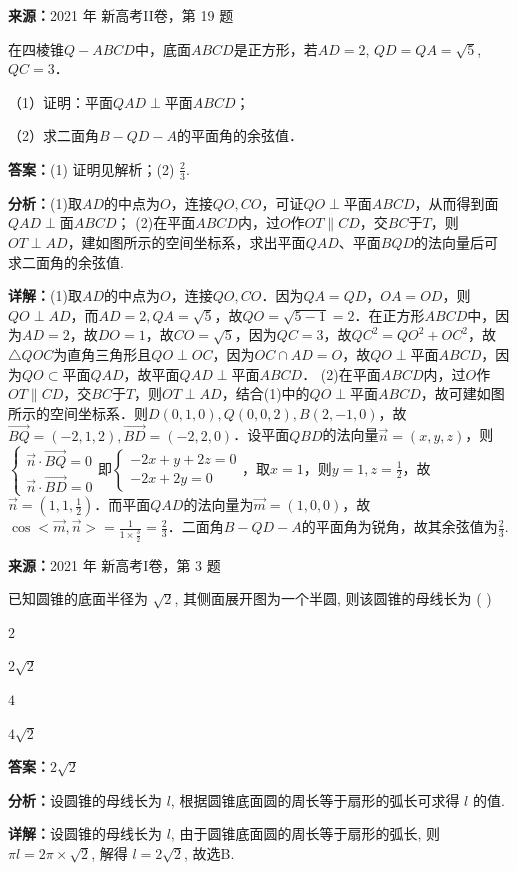 \begin{question}[points=12]
\textbf{来源：}2021 年 新高考II卷，第 19 题\par
在四棱锥$Q-ABCD$中，底面$ABCD$是正方形，若$AD=2$, $QD=QA=\sqrt{5}$, $QC=3$．

（1）证明：平面$QAD\perp$平面$ABCD$；

（2）求二面角$B-QD-A$的平面角的余弦值．
\begin{solution}
\textbf{答案：}(1) 证明见解析；(2) $\frac{2}{3}$.

\textbf{分析：}(1)取$AD$的中点为$O$，连接$QO,CO$，可证$QO\perp$平面$ABCD$，从而得到面$QAD\perp$面$ABCD$； (2)在平面$ABCD$内，过$O$作$OT\parallel CD$，交$BC$于$T$，则$OT\perp AD$，建如图所示的空间坐标系，求出平面$QAD$、平面$BQD$的法向量后可求二面角的余弦值.

\textbf{详解：}(1)取$AD$的中点为$O$，连接$QO,CO$．因为$QA=QD$，$OA=OD$，则$QO\perp AD$，而$AD=2,QA=\sqrt{5}$，故$QO=\sqrt{5-1}=2$．在正方形$ABCD$中，因为$AD=2$，故$DO=1$，故$CO=\sqrt{5}$，因为$QC=3$，故$QC^2=QO^2+OC^2$，故$\triangle QOC$为直角三角形且$QO\perp OC$，因为$OC\cap AD=O$，故$QO\perp$平面$ABCD$，因为$QO\subset$平面$QAD$，故平面$QAD\perp$平面$ABCD$． (2)在平面$ABCD$内，过$O$作$OT\parallel CD$，交$BC$于$T$，则$OT\perp AD$，结合(1)中的$QO\perp$平面$ABCD$，故可建如图所示的空间坐标系．则$D(0,1,0),Q(0,0,2),B(2,-1,0)$，故$\overrightarrow{BQ}=(-2,1,2),\overrightarrow{BD}=(-2,2,0)$．设平面$QBD$的法向量$\vec{n}=(x,y,z)$，则$\begin{cases} \vec{n}\cdot\overrightarrow{BQ}=0 \\ \vec{n}\cdot\overrightarrow{BD}=0 \end{cases}$即$\begin{cases} -2x+y+2z=0 \\ -2x+2y=0 \end{cases}$，取$x=1$，则$y=1,z=\frac{1}{2}$，故$\vec{n}=(1,1,\frac{1}{2})$．而平面$QAD$的法向量为$\vec{m}=(1,0,0)$，故$\cos<\vec{m},\vec{n}>=\frac{1}{1\times\frac{3}{2}}=\frac{2}{3}$．二面角$B-QD-A$的平面角为锐角，故其余弦值为$\frac{2}{3}$.
\end{solution}
\end{question}

\begin{question}[points=5]
\textbf{来源：}2021 年 新高考I卷，第 3 题\par
已知圆锥的底面半径为 $\sqrt{2}$, 其侧面展开图为一个半圆, 则该圆锥的母线长为 ( )
\begin{choices}
  \item $2$
  \item $2\sqrt{2}$
  \item $4$
  \item $4\sqrt{2}$
\end{choices}
\begin{solution}
\textbf{答案：}$2\sqrt{2}$

\textbf{分析：}设圆锥的母线长为 $l$, 根据圆锥底面圆的周长等于扇形的弧长可求得 $l$ 的值.

\textbf{详解：}设圆锥的母线长为 $l$, 由于圆锥底面圆的周长等于扇形的弧长, 则 $\pi l = 2\pi \times \sqrt{2}$, 解得 $l = 2\sqrt{2}$, 故选B.
\end{solution}
\end{question}


